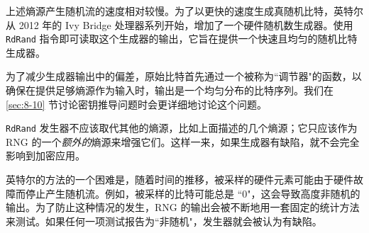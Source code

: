 \begin{snote}[高熵的随机生成。]
上述熵源产生随机流的速度相对较慢。为了以更快的速度生成真随机比特，英特尔从 2012 年的 Ivy Bridge 处理器系列开始，增加了一个硬件随机数生成器。使用 \texttt{RdRand} 指令即可读取这个生成器的输出，它旨在提供一个快速且均匀的随机比特生成器。

为了减少生成器输出中的偏差，原始比特首先通过一个被称为``调节器"的函数，以确保在提供足够熵源作为输入时，输出是一个均匀分布的比特序列。我们在 \ref{sec:8-10} 节讨论密钥推导问题时会更详细地讨论这个问题。

\texttt{RdRand} 发生器不应该取代其他的熵源，比如上面描述的几个熵源；它只应该作为 RNG 的一个\emph{额外的}熵源来增强它们。这样一来，如果生成器有缺陷，就不会完全影响到加密应用。

英特尔的方法的一个困难是，随着时间的推移，被采样的硬件元素可能由于硬件故障而停止产生随机流。例如，被采样的比特可能总是 ``$0$"，这会导致高度非随机的输出。为了防止这种情况的发生，RNG 的输出会被不断地用一套固定的统计方法来测试。如果任何一项测试报告为``非随机"，发生器就会被认为有缺陷。
\end{snote}